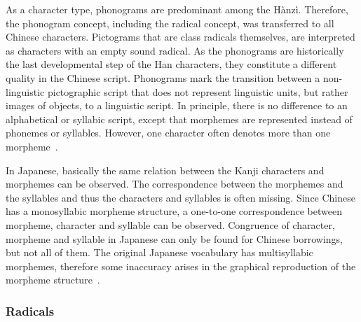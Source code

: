 As a character type, phonograms are predominant among the Hànzì. Therefore, the
phonogram concept, including the radical concept, was transferred to all Chinese 
characters. Pictograms that are class radicals themselves, are interpreted as 
characters with an empty sound radical. As the phonograms are historically the 
last developmental step of the Han characters, they constitute a different 
quality in the Chinese script. Phonograms mark the transition between a 
non-linguistic pictographic script that does not represent linguistic units, 
but rather images of objects, to a linguistic script. In principle, there is no 
difference to an alphabetical or syllabic script, except that morphemes are 
represented instead of phonemes or syllables. However, one character often 
denotes more than one morpheme~.

In Japanese, basically the same relation between the Kanji characters and 
morphemes can be observed. The correspondence between the morphemes and 
the syllables and thus the characters and syllables is often missing.
Since Chinese has a monosyllabic morpheme structure, a one-to-one correspondence
between morpheme, character and syllable can be observed.
Congruence of character, morpheme and syllable in Japanese can only be found for
Chinese borrowings, but not all of them. The original Japanese vocabulary has
multisyllabic morphemes, therefore some inaccuracy arises in the graphical
reproduction of the morpheme structure~.



\subsubsection{Radicals}
\label{sec:radicals}


